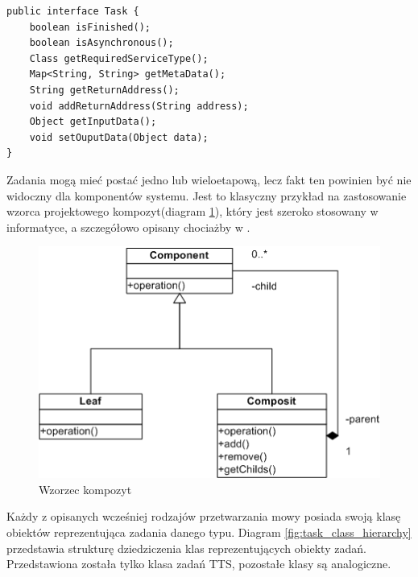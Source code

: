 \begin{center}
\begin{lstlisting}
public interface Task {
	boolean isFinished();
	boolean isAsynchronous();
	Class getRequiredServiceType();
	Map<String, String> getMetaData();
	String getReturnAddress();
	void addReturnAddress(String address);
	Object getInputData();
	void setOuputData(Object data);
}
\end{lstlisting}
\end{center}

Zadania mogą mieć postać jedno lub wieloetapową, lecz fakt ten powinien być nie widoczny dla komponentów systemu. Jest to klasyczny przykład na zastosowanie wzorca projektowego kompozyt(diagram \ref{fig:composite_pattern}), który jest szeroko stosowany w informatyce, a szczegółowo opisany chociażby w \cite{gamma1995}.

\begin{figure}[!h]
	\centering
	\includegraphics[scale=0.7]{composit_pattern.png}
	\caption{Wzorzec kompozyt}\label{fig:composite_pattern}
\end{figure}

Każdy z opisanych wcześniej rodzajów przetwarzania mowy posiada swoją klasę obiektów reprezentująca zadania danego typu. Diagram \ref {fig:task_class_hierarchy} przedstawia strukturę dziedziczenia klas reprezentujących obiekty zadań. Przedstawiona została tylko klasa zadań TTS, pozostałe klasy są analogiczne. 


